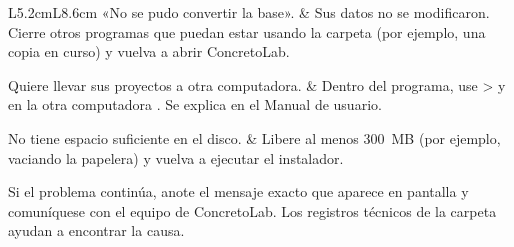 \begin{longtable}{L{5.2cm}L{8.6cm}}
	«No se pudo convertir la base». &
	Sus datos no se modificaron. Cierre otros programas que puedan estar usando la carpeta  (por ejemplo,
	una copia en curso) y vuelva a abrir ConcretoLab. \\ \hline

	Quiere llevar sus proyectos a otra computadora. &
	Dentro del programa, use  \textgreater{}  y en la otra computadora
	. Se explica en el Manual de usuario. \\ \hline

	No tiene espacio suficiente en el disco. &
	Libere al menos 300~MB (por ejemplo, vaciando la papelera) y vuelva a ejecutar el instalador. \\
\end{longtable}

Si el problema continúa, anote el mensaje exacto que aparece en pantalla y comuníquese con el equipo de ConcretoLab. Los
registros técnicos de la carpeta  ayudan a encontrar la causa.
